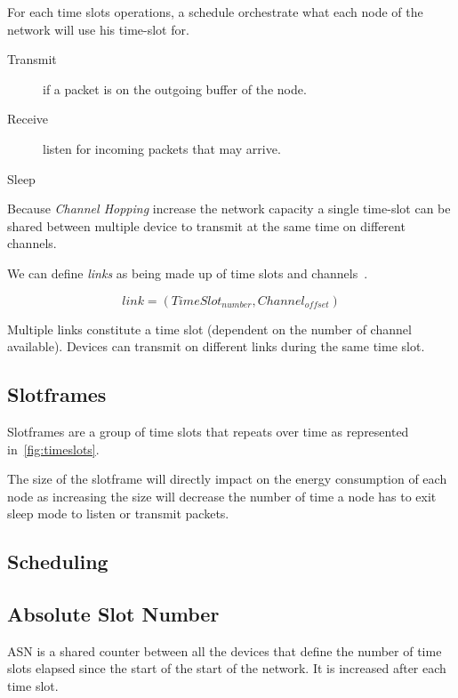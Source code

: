 For each time slots operations, a schedule orchestrate what each
node of the network will use his time-slot for.

\begin{description}
  \item [Transmit] if a packet is on the outgoing buffer of the node.
  \item [Receive] listen for incoming packets that may arrive.
  \item [Sleep]
\end{description}

Because \emph{Channel Hopping} increase the network capacity a single time-slot
can be shared between multiple device to transmit at the same time on different
channels.

We can define \emph{links} as being made up of time slots and
channels~\cite{Chen2013PerformanceAO}.

\begin{equation}
  \label{eq:links}
  link = (TimeSlot_{number}, Channel_{offset})
\end{equation}

Multiple links constitute a time slot (dependent on the number of channel
available). Devices can transmit on different links during the same time slot.

\subsection{Slotframes}

Slotframes are a group of time slots that repeats over time as represented
in~\ref{fig:timeslots}. 

The size of the slotframe will directly impact on the energy consumption of
each node as increasing the size will decrease the number of time a node has
to exit sleep mode to listen or transmit packets.



\subsection{Scheduling}

\subsection{Absolute Slot Number}

ASN is a shared counter between all the devices that define the number of time slots 
elapsed since the start of the start of the network.
It is increased after each time slot.

